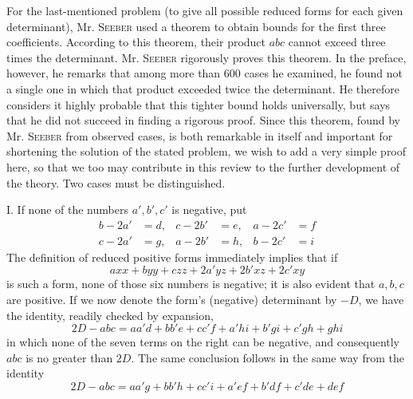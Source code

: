 For the last-mentioned problem (to give all possible reduced forms for each given determinant), Mr. \textsc{Seeber} used a theorem to obtain bounds for the first three coefficients. According to this theorem, their product $abc$ cannot exceed three times the determinant. Mr. \textsc{Seeber} rigorously proves this theorem. In the preface, however, he remarks that among more than 600 cases he examined, he found not a single one in which that product exceeded twice the determinant. He therefore considers it highly probable that this tighter bound holds universally, but says that he did not succeed in finding a rigorous proof. Since this theorem, found by Mr. \textsc{Seeber} from observed cases, is both remarkable in itself and important for shortening the solution of the stated problem, we wish to add a very simple proof here, so that we too may contribute in this review to the further development of the theory. Two cases must be distinguished.

I. If none of the numbers $a',b',c'$ is negative, put
\[
\begin{aligned}
b-2a'&=d,&c-2b'&=e,&a-2c'&=f\\
c-2a'&=g,&a-2b'&=h,&b-2c'&=i
\end{aligned}
\]
The definition of reduced positive forms immediately implies that if
\[
axx+byy+czz+2a'yz+2b'xz+2c'xy
\]
is such a form, none of those six numbers is negative; it is also evident that $a,b,c$ are positive. If we now denote the form's (negative)
determinant by $-D$, we have the identity, readily checked by expansion,
\[
2D-abc=aa'd+bb'e+cc'f+a'hi+b'gi+c'gh+ghi
\]
in which none of the seven terms on the right can be negative, and consequently $abc$ is no greater than $2D$. The same conclusion follows in the same way from the identity
\[
2D-abc=aa'g+bb'h+cc'i+a'ef+b'df+c'de+def
\]

